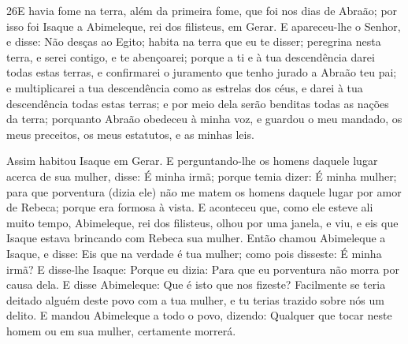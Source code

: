 \smallskip

\lettrine{26} E havia fome na terra, além da primeira fome,
que foi nos dias de Abraão; por isso foi Isaque a Abimeleque, rei
dos filisteus, em Gerar. E apareceu-lhe o Senhor, e disse: Não
desças ao Egito; habita na terra que eu te disser; peregrina
nesta terra, e serei contigo, e te abençoarei; porque a ti e à tua
descendência darei todas estas terras, e confirmarei o juramento que
tenho jurado a Abraão teu pai; e multiplicarei a tua
descendência como as estrelas dos céus, e darei à tua descendência
todas estas terras; e por meio dela serão benditas todas as nações
da terra; porquanto Abraão obedeceu à minha voz, e guardou o meu
mandado, os meus preceitos, os meus estatutos, e as minhas leis.

Assim habitou Isaque em Gerar. E perguntando-lhe os homens
daquele lugar acerca de sua mulher, disse: É minha irmã; porque
temia dizer: É minha mulher; para que porventura (dizia ele) não me
matem os homens daquele lugar por amor de Rebeca; porque era formosa
à vista. E aconteceu que, como ele esteve ali muito tempo,
Abimeleque, rei dos filisteus, olhou por uma janela, e viu, e eis
que Isaque estava brincando com Rebeca sua mulher. Então chamou
Abimeleque a Isaque, e disse: Eis que na verdade é tua mulher; como
pois disseste: É minha irmã? E disse-lhe Isaque: Porque eu dizia:
Para que eu porventura não morra por causa dela. E disse
Abimeleque: Que é isto que nos fizeste? Facilmente se teria deitado
alguém deste povo com a tua mulher, e tu terias trazido sobre nós um
delito. E mandou Abimeleque a todo o povo, dizendo: Qualquer
que tocar neste homem ou em sua mulher, certamente morrerá.

